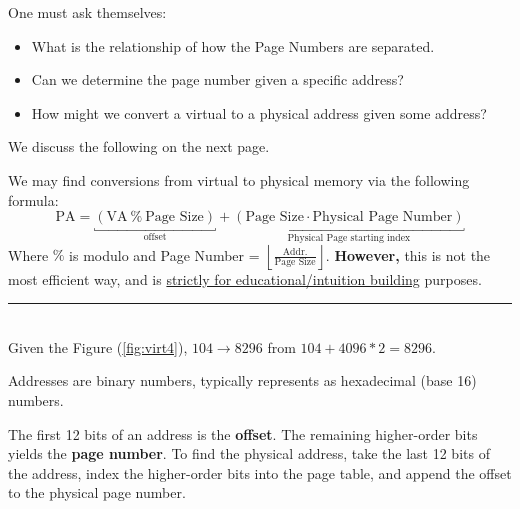 \noindent
One must ask themselves:
\begin{itemize}
    \item What is the relationship of how the Page Numbers are separated.
    \item Can we determine the page number given a specific address?
    \item How might we convert a virtual to a physical address given some address?
\end{itemize}
\noindent
We discuss the following on the next page.

\newpage 
\begin{Example}

    \label{theo:virt2phys}
    We may find conversions from virtual to physical memory via the following formula: $$\text{PA} = \underbracket{(\text{VA}\ \%\ \text{Page Size})}_{\text{offset}} + \underbracket{(\text{Page Size} \cdot \text{Physical Page Number})}_{\text{Physical Page starting index}}$$
    \noindent
    Where $\%$ is modulo and Page Number = $\left\lfloor \frac{\text{Addr.}}{\text{Page Size}} \right\rfloor$. \textbf{However,} this is not the most efficient way,
    and is \underline{strictly for educational/intuition building} purposes.\\

    \noindent
    \rule{\textwidth}{0.4pt}\\

    \noindent
    Given the Figure (\ref{fig:virt4}), $104\to 8296$ from $104 + 4096 * 2 = 8296$.
\end{Example}
\begin{theo}

    Addresses are binary numbers, typically represents as hexadecimal (base 16) numbers.
    
    \noindent 
    The first 12 bits of an address is the \textbf{offset}. The remaining higher-order bits yields the \textbf{page number}. To find the physical address, take the last 12 bits of the address, index the higher-order bits into the page table, and append the offset to the physical page number.
\end{theo}

